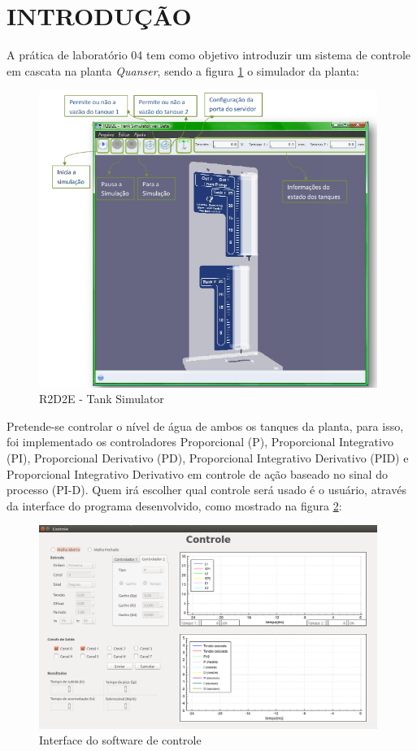 \documentclass[a4paper,12pt]{article}
\begin{document}

\thispagestyle{main}

\section{INTRODUÇÃO}

\hspace{4ex}A prática de laboratório 04 tem como objetivo introduzir um sistema de controle em cascata na planta \textit{Quanser}, sendo a figura \ref{r2d2e} o simulador da planta:

\begin{figure}[H]
\centering
\includegraphics[width=11cm]{ImagensLab4/simulator.png}
\caption{R2D2E - Tank Simulator}
\label{r2d2e}
\end{figure}

\hspace{4ex}Pretende-se controlar o nível de água de ambos os tanques da planta, para isso, foi implementado os controladores Proporcional (P), Proporcional Integrativo (PI), Proporcional Derivativo (PD), Proporcional Integrativo Derivativo (PID) e Proporcional Integrativo Derivativo em controle de ação baseado no sinal do processo (PI-D). Quem irá escolher qual controle será usado é o usuário, através da interface do programa desenvolvido, como mostrado na figura \ref{interface}:

\begin{figure}[H]
\centering
\includegraphics[width=11cm]{ImagensLab4/interface-versao4.png}
\caption{Interface do software de controle}
\label{interface}
\end{figure}
\end{document}

